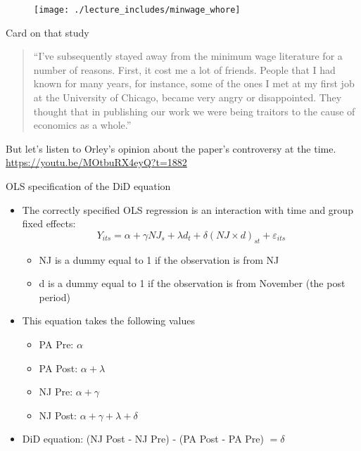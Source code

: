 \documentclass{beamer}
\begin{document}
\begin{frame}
	\begin{figure}
	\texttt{[image: ./lecture\_includes/minwage\_whore]}
	\end{figure}
\end{frame}

\begin{frame}{Card on that study}

\begin{quote}
``I’ve subsequently stayed away from the minimum wage literature for a number of reasons. First, it cost me a lot of friends. People that I had known for many years, for instance, some of the ones I met at my first job at the University of Chicago, became very angry or disappointed. They thought that in publishing our work we were being traitors to the cause of economics as a whole.''
\end{quote}

\bigskip

But let's listen to Orley's opinion about the paper's controversy at the time.  \url{https://youtu.be/MOtbuRX4eyQ?t=1882}

\end{frame}


\begin{frame}{OLS specification of the DiD equation}
	
	\begin{itemize}
	\item The correctly specified OLS regression is an interaction with time and group fixed effects:$$Y_{its} = \alpha + \gamma NJ_s + \lambda d_t + \delta (NJ \times d)_{st} + \varepsilon_{its}$$
		\begin{itemize}
		\item NJ is a dummy equal to 1 if the observation is from NJ
		\item d is a dummy equal to 1 if the observation is from November (the post period)
		\end{itemize}
	\item This equation takes the following values
		\begin{itemize}
		\item PA Pre: $\alpha$
		\item PA Post: $\alpha + \lambda$
		\item NJ Pre: $\alpha + \gamma$
		\item NJ Post: $\alpha + \gamma + \lambda + \delta$
		\end{itemize}
	\item DiD equation: (NJ Post - NJ Pre) - (PA Post - PA Pre) $= \delta$
	\end{itemize}
\end{frame}
\end{document}
